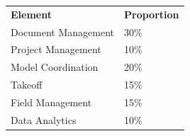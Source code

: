 \begin{table}[h!]
	\begin{center}
	\begin{tabular}{p{5cm}  p{5cm} }
     	\toprule
		\textbf{Element} & \textbf{Proportion} \\ 
    	\cmidrule(r){1-1}\cmidrule(lr){2-2}
      	Document Management & 30\%\\
      	Project Management & 10\%\\
      	Model Coordination & 20\%\\
      	Takeoff & 15\%\\
      	Field Management & 15\%\\
      	Data Analytics & 10\%\\
      	\bottomrule
    \end{tabular}
    \label{tbl:markSchemeAsmt2}
    \end{center}
\end{table}

